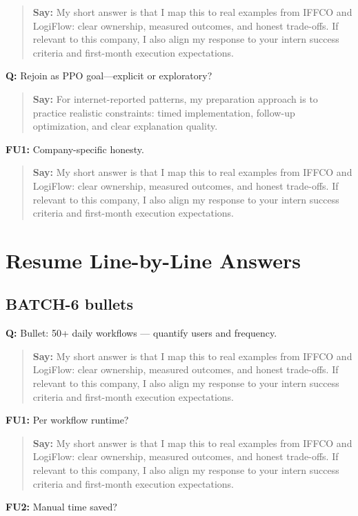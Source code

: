 \documentclass[9pt,a4paper]{article}
\begin{document}
\begin{quote}\small\textbf{Say:} My short answer is that I map this to real examples from IFFCO and LogiFlow: clear ownership, measured outcomes, and honest trade-offs. If relevant to this company, I also align my response to your intern success criteria and first-month execution expectations.\end{quote}
\vspace{2mm}
\textbf{Q:} Rejoin as PPO goal---explicit or exploratory?

\begin{quote}\small\textbf{Say:} For internet-reported patterns, my preparation approach is to practice realistic constraints: timed implementation, follow-up optimization, and clear explanation quality.\end{quote}
\vspace{2mm}
\textbf{FU1:} Company-specific honesty.

\begin{quote}\small\textbf{Say:} My short answer is that I map this to real examples from IFFCO and LogiFlow: clear ownership, measured outcomes, and honest trade-offs. If relevant to this company, I also align my response to your intern success criteria and first-month execution expectations.\end{quote}
\vspace{2mm}
\section{Resume Line-by-Line Answers}
\subsection{BATCH-6 bullets}
\textbf{Q:} Bullet: 50+ daily workflows --- quantify users and frequency.

\begin{quote}\small\textbf{Say:} My short answer is that I map this to real examples from IFFCO and LogiFlow: clear ownership, measured outcomes, and honest trade-offs. If relevant to this company, I also align my response to your intern success criteria and first-month execution expectations.\end{quote}
\vspace{2mm}
\textbf{FU1:} Per workflow runtime?

\begin{quote}\small\textbf{Say:} My short answer is that I map this to real examples from IFFCO and LogiFlow: clear ownership, measured outcomes, and honest trade-offs. If relevant to this company, I also align my response to your intern success criteria and first-month execution expectations.\end{quote}
\vspace{2mm}
\textbf{FU2:} Manual time saved?
\end{document}

